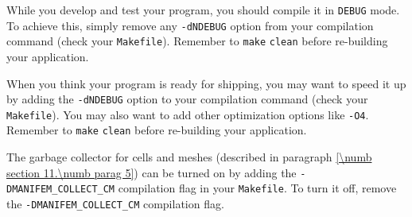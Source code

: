 While you develop and test your program, you should compile it in {\small\tt DEBUG} mode.
To achieve this, simply remove any {\small\tt -dNDEBUG} option from your compilation
command (check your {\small\tt Makefile}).
Remember to {\small\tt make} {\small\tt clean} before re-building your application.

When you think your program is ready for shipping, you may want to speed it up
by adding the {\small\tt -dNDEBUG} option to your compilation command
(check your {\small\tt Makefile}).
You may also want to add other optimization options like {\small\tt -O4}.
Remember to {\small\tt make} {\small\tt  clean} before re-building your application.

The garbage collector for cells and meshes (described in paragraph
\ref{\numb section 11.\numb parag 5}) can be turned on by adding the
{\small\tt -DMANIFEM\_COLLECT\_CM} compilation flag in your {\small\tt Makefile}.
To turn it off, remove the {\small\tt -DMANIFEM\_COLLECT\_CM} compilation flag.


